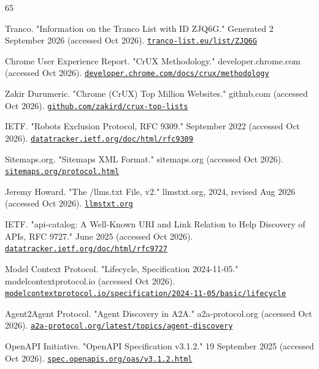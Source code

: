\documentclass{article}
\begin{document}
\small
\begin{thebibliography}{65}
\raggedright

Tranco. "Information on the Tranco List with ID ZJQ6G." Generated 2 September 2026 (accessed Oct 2026). \href{https://tranco-list.eu/list/ZJQ6G}{\nolinkurl{tranco-list.eu/list/ZJQ6G}}

Chrome User Experience Report. "CrUX Methodology." developer.chrome.com (accessed Oct 2026). \href{https://developer.chrome.com/docs/crux/methodology}{\nolinkurl{developer.chrome.com/docs/crux/methodology}}

Zakir Durumeric. "Chrome (CrUX) Top Million Websites." github.com (accessed Oct 2026). \href{https://github.com/zakird/crux-top-lists}{\nolinkurl{github.com/zakird/crux-top-lists}}

IETF. "Robots Exclusion Protocol, RFC 9309." September 2022 (accessed Oct 2026). \href{https://datatracker.ietf.org/doc/html/rfc9309}{\nolinkurl{datatracker.ietf.org/doc/html/rfc9309}}

Sitemaps.org. "Sitemaps XML Format." sitemaps.org (accessed Oct 2026). \href{https://www.sitemaps.org/protocol.html}{\nolinkurl{sitemaps.org/protocol.html}}

Jeremy Howard. "The /llms.txt File, v2." llmstxt.org, 2024, revised Aug 2026 (accessed Oct 2026). \href{https://llmstxt.org}{\nolinkurl{llmstxt.org}}

IETF. "api-catalog: A Well-Known URI and Link Relation to Help Discovery of APIs, RFC 9727." June 2025 (accessed Oct 2026). \href{https://datatracker.ietf.org/doc/html/rfc9727}{\nolinkurl{datatracker.ietf.org/doc/html/rfc9727}}

Model Context Protocol. "Lifecycle, Specification 2024-11-05." modelcontextprotocol.io (accessed Oct 2026). \href{https://modelcontextprotocol.io/specification/2024-11-05/basic/lifecycle}{\nolinkurl{modelcontextprotocol.io/specification/2024-11-05/basic/lifecycle}}

Agent2Agent Protocol. "Agent Discovery in A2A." a2a-protocol.org (accessed Oct 2026). \href{https://a2a-protocol.org/latest/topics/agent-discovery/}{\nolinkurl{a2a-protocol.org/latest/topics/agent-discovery}}

OpenAPI Initiative. "OpenAPI Specification v3.1.2." 19 September 2025 (accessed Oct 2026). \href{https://spec.openapis.org/oas/v3.1.2.html}{\nolinkurl{spec.openapis.org/oas/v3.1.2.html}}


\end{thebibliography}
\end{document}
